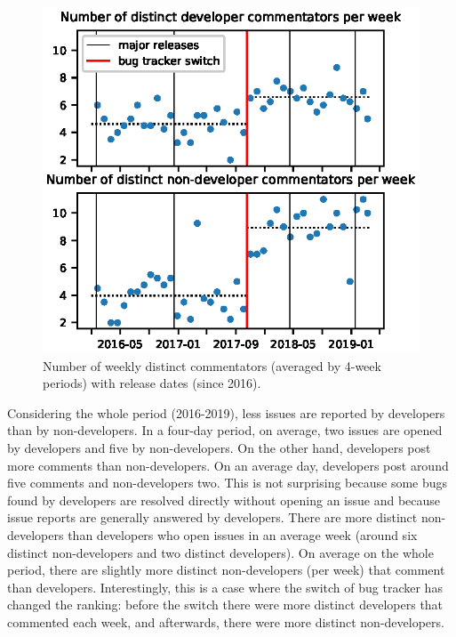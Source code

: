 \documentclass[conference]{IEEEtran}
\begin{document}
\begin{figure}
\includegraphics{commentators_with_releases.eps}
\caption{Number of weekly distinct commentators (averaged by 4-week periods) with release dates (since 2016).} \label{commentators_with_releases}
\end{figure}

Considering the whole period (2016-2019), less issues are reported by developers than by non-developers. In a four-day period, on average, two issues are opened by developers and five by non-developers. On the other hand, developers post more comments than non-developers. On an average day, developers post around five comments and non-developers two. This is not surprising because some bugs found by developers are resolved directly without opening an issue and because issue reports are generally answered by developers.
There are more distinct non-developers than developers who open issues in an average week (around six distinct non-developers and two distinct developers).
On average on the whole period, there are slightly more distinct non-developers (per week) that comment than developers. Interestingly, this is a case where the switch of bug tracker has changed the ranking: before the switch there were more distinct developers that commented each week, and afterwards, there were more distinct non-developers.
\end{document}
